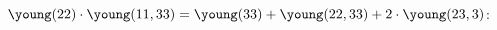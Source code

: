 \documentclass[draft]{article} %
\begin{document}
\begin{comment}
$$
\begin{array}{cccc}\vspace{1mm}
    \young(11111133,2222) & \text{for } I_1 & \text{Lusztig: }(202) & \dim = (2,0,-2) \\ \vspace{1mm}
    \young(11111122,2233) & \text{for } I_2 & \text{Lusztig: }(020) & \dim = (2,0,-2) \\ \vspace{1mm}
    \young(11111123,2223) & \text{for } I_3 & \text{Lusztig: }(111) & \dim = (2,0,-2).
\end{array}
$$
The MV cycle for each ideal is isomorphic to $\PP^2 \times \PP^2$.
\end{example}
\end{comment}

\begin{example}
$\young(22)\arfu\young(11,33)= \young(33) + \young(22,33) + 2\cdot \young(23,3)$:
% 
% 
% 


\end{example}
\end{document}
